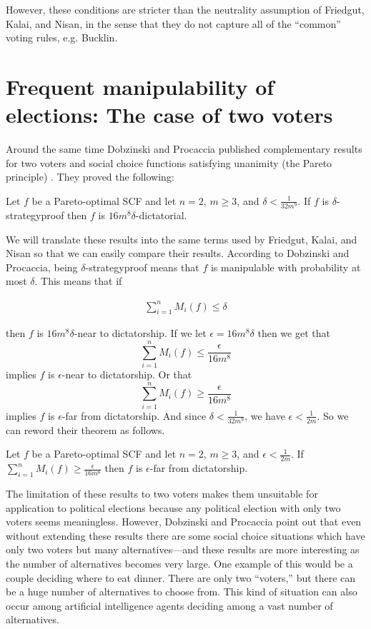 	However, these conditions are stricter than the neutrality assumption of Friedgut, Kalai, and Nisan, in the sense that they do not capture all of the ``common'' voting rules, e.g. Bucklin.


\section{Frequent manipulability of elections: The case of two voters}

	Around the same time Dobzinski and Procaccia published complementary results for two voters and social choice functions satisfying unanimity (the Pareto principle) \cite{dobzinski2008frequent}. They proved the following:

	\begin{theorem}
		Let $f$ be a Pareto-optimal SCF and let $n = 2$, $m \ge 3$, and $\delta < \frac{1}{32m^9}$. If $f$ is $\delta$-strategyproof then $f$ is $16m^8 \delta$-dictatorial.
	\end{theorem}

	We will translate these results into the same terms used by Friedgut, Kalai, and Nisan so that we can easily compare their results. According to Dobzinski and Procaccia, being $\delta$-strategyproof means that $f$ is manipulable with probability at most $\delta$. This means that if

	\begin{align*}
		\sum_{i=1}^n M_i(f) \le \delta
	\end{align*}

	then $f$ is $16m^8 \delta$-near to dictatorship. If we let $\epsilon = 16m^8 \delta$ then we get that
	\[
		\sum_{i=1}^n M_i(f) \le \frac{\epsilon}{16m^8}
	\]
	implies $f$ is $\epsilon$-near to dictatorship. Or that
	\[
		\sum_{i=1}^n M_i(f) \ge \frac{\epsilon}{16m^8}
	\]
	implies $f$ is $\epsilon$-far from dictatorship. And since $\delta < \frac{1}{32m^9}$, we have $\epsilon < \frac{1}{2m}$. So we can reword their theorem as follows.

	\begin{theorem}
		Let $f$ be a Pareto-optimal SCF and let $n = 2$, $m \ge 3$, and $\epsilon < \frac{1}{2m}$. If $\sum_{i=1}^n M_i(f) \ge \frac{\epsilon}{16m^8}$ then $f$ is $\epsilon$-far from dictatorship.
	\end{theorem}

	The limitation of these results to two voters makes them unsuitable for application to political elections because any political election with only two voters seems meaningless. However, Dobzinski and Procaccia point out that even without extending these results there are some social choice situations which have only two voters but many alternatives---and these results are more interesting as the number of alternatives becomes very large. One example of this would be a couple deciding where to eat dinner. There are only two ``voters,'' but there can be a huge number of alternatives to choose from. This kind of situation can also occur among artificial intelligence agents deciding among a vast number of alternatives.


